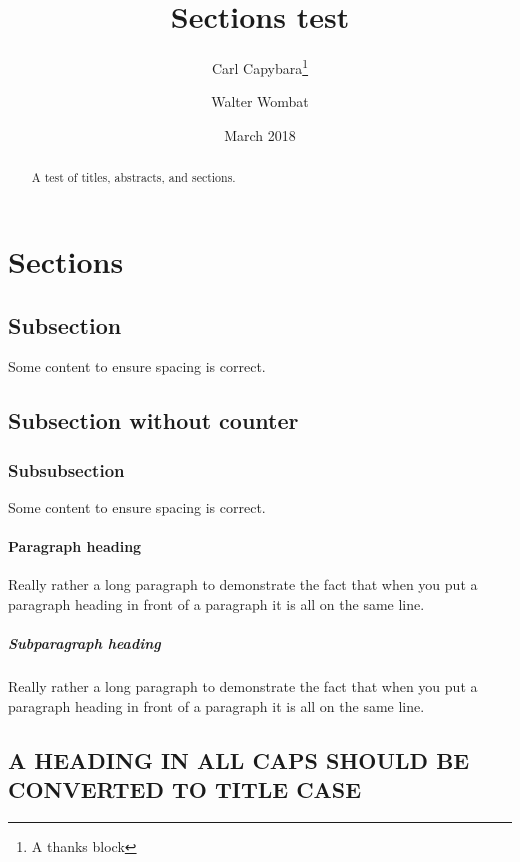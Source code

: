 \documentclass{article}
\begin{document}
  \title{Sections test}
  \author{Carl Capybara\thanks{A thanks block} \and Walter Wombat}
  \date{March 2018}
  \maketitle
  \begin{abstract}
    A test of titles, abstracts, and sections.
  \end{abstract}
  \section{Sections}

  \subsection{Subsection}

  Some content to ensure spacing is correct.

  \subsection*{Subsection without counter}

  \subsubsection{Subsubsection}

  Some content to ensure spacing is correct.

  \paragraph{Paragraph heading}

  Really rather a long paragraph to demonstrate the fact that when you put a paragraph heading in front of a paragraph it is all on the same line.

  \subparagraph{Subparagraph heading}

  Really rather a long paragraph to demonstrate the fact that when you put a paragraph heading in front of a paragraph it is all on the same line.

  \subsection{A HEADING IN ALL CAPS SHOULD BE CONVERTED TO TITLE CASE}
\end{document}
